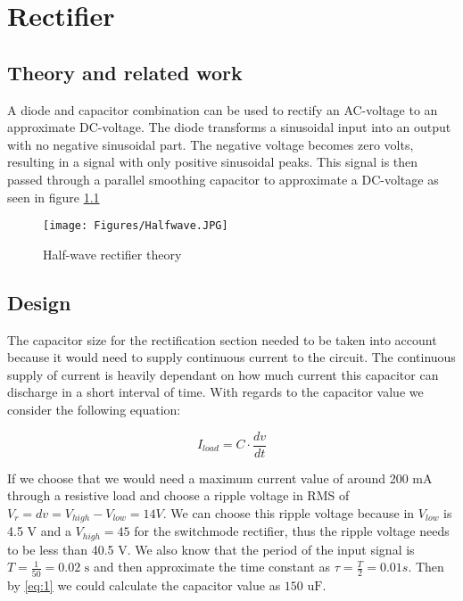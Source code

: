 \chapter{Rectifier}
\section{Theory and related work} \label{sec:literature_rectifier}


A diode and capacitor combination can be used to rectify an AC-voltage to an approximate DC-voltage. The diode transforms a sinusoidal input into an output with no negative sinusoidal part. The negative voltage becomes zero volts, resulting in a signal with only positive sinusoidal peaks. This signal is then passed through a parallel smoothing capacitor to approximate a DC-voltage as seen in figure \ref{fig:Halfwave}

\begin{figure}[h]
    \centering
    \texttt{[image: Figures/Halfwave.JPG]}
    \caption{Half-wave rectifier theory}
    \label{fig:Halfwave}
\end{figure}


\section{Design} \label{sec:design_rectifier}

The capacitor size for the rectification section needed to be taken into account because it would need to supply continuous current to the circuit. The continuous supply of current is heavily dependant on how much current this capacitor can discharge in a short interval of time. With regards to the capacitor value we consider the following equation:

\begin{equation}\label{eq:1}
    I_{load}  = C \cdot \frac{dv}{dt}
\end{equation}

If we choose that we would need a maximum current value of around 200 mA through a resistive load and choose a ripple voltage in RMS of $V_r = dv = V_{high} - V_{low} = 14 V $. We can choose this ripple voltage because in \cite{TI:LM2595} $V_{low}$ is 4.5 V and a $V_{high} = 45$ for the switchmode rectifier, thus the ripple voltage needs to be less than 40.5 V. We also know that the period of the input signal is $T = \frac{1}{50} = 0.02 \text{ s}$ and then approximate the time constant as $\tau = \frac{T}{2} = 0.01 s$. Then by \ref{eq:1} we could calculate the capacitor value as $150 \text{ uF}$.

